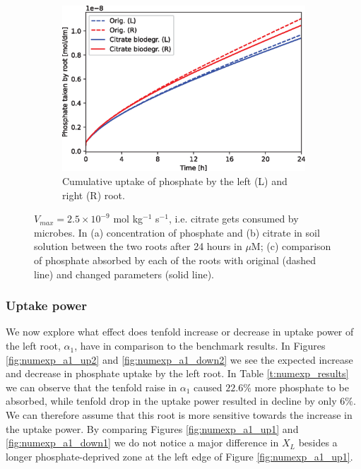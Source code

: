 \documentclass[11pt]{article}
\numberwithin{equation}{section}
\begin{document}
\begin{figure}[!htb]
\begin{subfigure}[t]{0.37\textwidth}
    \includegraphics[width=\textwidth]{Figures/citratevmaxnonzero.eps}
    \caption{Cumulative uptake of phosphate by the left (L) and right (R) root.}
    \label{fig:numexp_vmax2}
\end{subfigure}
\caption{$V_{max} = 2.5 \times 10^{-9}$ mol kg$^{-1}$ s$^{-1}$, i.e. citrate gets consumed by microbes. In (a) concentration of phosphate and (b) citrate in soil solution between the two roots after 24 hours in $\mu$M; (c) comparison of phosphate absorbed by each of the roots with original (dashed line) and changed parameters (solid line).}
\end{figure}

\subsubsection{Uptake power}
\label{sec:numexp_a1}
We now explore what effect does tenfold increase or decrease in uptake power of the left root, $\alpha_1$, have in comparison to the benchmark results. In Figures \ref{fig:numexp_a1_up2} and \ref{fig:numexp_a1_down2} we see the expected increase and decrease in phosphate uptake by the left root. In Table \ref{t:numexp_results} we can observe that the tenfold raise in $\alpha_1$ caused $22.6 \%$ more phosphate to be absorbed, while tenfold drop in the uptake power resulted in decline by only $6 \%$. We can therefore assume that this root is more sensitive towards the increase in the uptake power. By comparing Figures \ref{fig:numexp_a1_up1} and \ref{fig:numexp_a1_down1} we do not notice a major difference in $X_L$ besides a longer phosphate-deprived zone at the left edge of Figure \ref{fig:numexp_a1_up1}.
\end{document}
